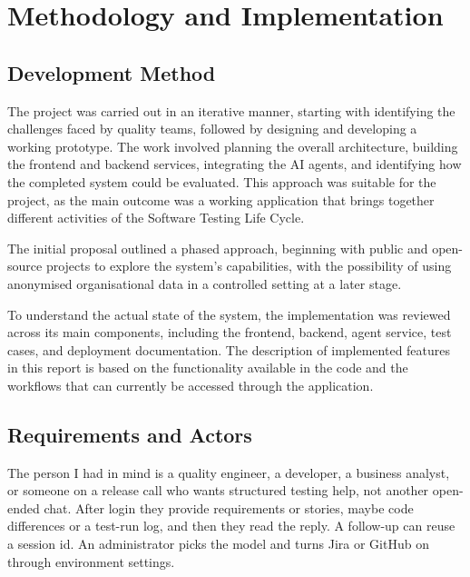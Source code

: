 \chapter{Methodology and Implementation}
\label{chap:methodology}

\section{Development Method}
The project was carried out in an iterative manner, starting with identifying the challenges faced by quality teams, followed by designing and developing a working prototype. The work involved planning the overall architecture, building the frontend and backend services, integrating the AI agents, and identifying how the completed system could be evaluated. This approach was suitable for the project, as the main outcome was a working application that brings together different activities of the Software Testing Life Cycle.

The initial proposal outlined a phased approach, beginning with public and open-source projects to explore the system's capabilities, with the possibility of using anonymised organisational data in a controlled setting at a later stage.

To understand the actual state of the system, the implementation was reviewed across its main components, including the frontend, backend, agent service, test cases, and deployment documentation. The description of implemented features in this report is based on the functionality available in the code and the workflows that can currently be accessed through the application.

\section{Requirements and Actors}
The person I had in mind is a quality engineer, a developer, a business analyst, or someone on a release call who wants structured testing help, not another open-ended chat. After login they provide requirements or stories, maybe code differences or a test-run log, and then they read the reply. A follow-up can reuse a session id. An administrator picks the model and turns Jira or GitHub on through environment settings.


